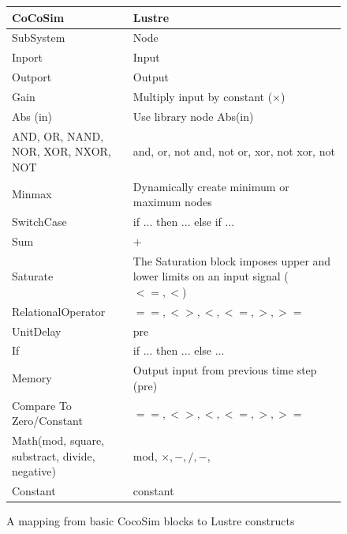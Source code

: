\documentclass{article}
\begin{document}
\begin{figure}[t]
\centering
{
\begin{tabular}{lp{5cm}}
\hline
\textbf{CoCoSim} & \textbf{Lustre}  \\
\hline
SubSystem & 
Node
\\
Inport &
Input
\\
Outport &
Output
\\
Gain &
Multiply input by constant ($\times$)
\\

Abs (in) &
Use library node Abs(in)
\\

AND, OR, NAND, NOR, XOR, NXOR, NOT
&
and, or, not and, not or, xor, not xor, not
\\

Minmax &
{Dynamically create minimum or maximum nodes}
\\

SwitchCase &
{if ... then ... else if ... }
\\

Sum &
$+$
\\

Saturate &
The Saturation block imposes upper and lower limits on an input signal ($<=, <$)
\\

RelationalOperator &
$==, <>, <, <=, >, >=$
\\

UnitDelay &
pre
\\

If &
if ... then ... else ...
\\

Memory &
Output input from previous time step (pre)
\\

Compare To Zero/Constant  &
$==, <>, <, <=, >, >=$
\\

Math(mod, square, substract, divide, negative) &
mod, $\times, -, /, - $, 
\\

Constant &
constant
\\

\hline
\end{tabular}
}
\caption{A mapping from basic CocoSim blocks to Lustre constructs}
\label{basicmapping}
\end{figure}
\end{document}
